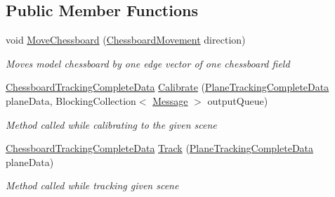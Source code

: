 \subsection*{Public Member Functions}
\begin{DoxyCompactItemize}
\item 
void \mbox{\hyperlink{class_chess_tracking_1_1_image_processing_1_1_pipeline_parts_1_1_stages_1_1_chessboard_localization_a3a641c2a7c9880434785b1c7f0a71327}{Move\+Chessboard}} (\mbox{\hyperlink{namespace_chess_tracking_1_1_multithreading_messages_1_1_to_processing_af48751428f7a12d314dbbac688726bac}{Chessboard\+Movement}} direction)
\begin{DoxyCompactList}\small\item\em Moves model chessboard by one edge vector of one chessboard field \end{DoxyCompactList}\item 
\mbox{\hyperlink{class_chess_tracking_1_1_image_processing_1_1_pipeline_data_1_1_chessboard_tracking_complete_data}{Chessboard\+Tracking\+Complete\+Data}} \mbox{\hyperlink{class_chess_tracking_1_1_image_processing_1_1_pipeline_parts_1_1_stages_1_1_chessboard_localization_a488e6669ff26af88dc52e14f7a661e13}{Calibrate}} (\mbox{\hyperlink{class_chess_tracking_1_1_image_processing_1_1_pipeline_data_1_1_plane_tracking_complete_data}{Plane\+Tracking\+Complete\+Data}} plane\+Data, Blocking\+Collection$<$ \mbox{\hyperlink{class_chess_tracking_1_1_multithreading_messages_1_1_message}{Message}} $>$ output\+Queue)
\begin{DoxyCompactList}\small\item\em Method called while calibrating to the given scene \end{DoxyCompactList}\item 
\mbox{\hyperlink{class_chess_tracking_1_1_image_processing_1_1_pipeline_data_1_1_chessboard_tracking_complete_data}{Chessboard\+Tracking\+Complete\+Data}} \mbox{\hyperlink{class_chess_tracking_1_1_image_processing_1_1_pipeline_parts_1_1_stages_1_1_chessboard_localization_af037b24a2883a66cd72895a7d2db3965}{Track}} (\mbox{\hyperlink{class_chess_tracking_1_1_image_processing_1_1_pipeline_data_1_1_plane_tracking_complete_data}{Plane\+Tracking\+Complete\+Data}} plane\+Data)
\begin{DoxyCompactList}\small\item\em Method called while tracking given scene \end{DoxyCompactList}\end{DoxyCompactItemize}
